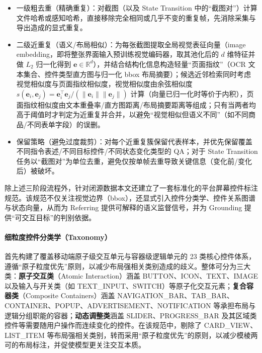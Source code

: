\begin{itemize}
  \item 一级粗去重（精确重复）：对截图（以及 State Transition 中的“截图对”）计算文件哈希或感知哈希，直接移除完全相同或几乎不变的重复帧，先消除采集与导出造成的显式重复。
  \item 二级近重复（语义/布局相似）：为每张截图提取全局视觉表征向量（image embedding，即将整张界面输入预训练视觉编码器，取其池化后的 $d$ 维特征并做 $L_2$ 归一化得到 $\mathbf{e}\in\mathbb{R}^d$），并结合结构化信息构造轻量“页面指纹”（OCR 文本集合、控件类型直方图与归一化 bbox 布局摘要）；候选近邻检索同时考虑视觉相似度与页面指纹相似度，视觉相似度由余弦相似度 $s(\mathbf{e}_i,\mathbf{e}_j)=\mathbf{e}_i^\top\mathbf{e}_j/(\|\mathbf{e}_i\|\|\mathbf{e}_j\|)$ 计算（向量已归一化时等价于内积），页面指纹相似度由文本重叠率/直方图距离/布局摘要距离等组成；只有当两者均高于阈值时才判定为近重复并合并，以避免“视觉相似但语义不同”（如不同商品/不同表单字段）的误删。
  \item 保留策略（避免过度裁剪）：对每个近重复簇保留代表样本，并优先保留覆盖不同指令表述/不同目标控件/不同状态变化类型的 QA；对于 State Transition 任务以“截图对”为单位去重，避免仅按单帧去重导致关键信息（变化前/变化后）被破坏。
\end{itemize}

除上述三阶段流程外，针对闭源数据本文还建立了一套标准化的平台屏幕控件标注规范。该规范不仅关注视觉边界（bbox），还显式引入控件分类学、控件关系图谱与状态向量，从而为 Referring 提供可解释的语义监督信号，并为 Grounding 提供“可交互目标”的判别依据。

\paragraph{细粒度控件分类学（Taxonomy）}
首先构建了覆盖移动端原子级交互单元与容器级逻辑单元的 23 类核心控件体系，遵循“原子粒度优先”原则，以减少布局强相关类别造成的歧义。整体可分为三大类：\textbf{原子交互类}（Atomic Interaction）涵盖 BUTTON、ICON、TEXT、IMAGE 以及输入与开关类（如 TEXT\_INPUT、SWITCH）等原子化交互元素；\textbf{复合容器类}（Composite Containers）涵盖 NAVIGATION\_BAR、TAB\_BAR、CONTAINER、POPUP、ADVERTISEMENT、NOTIFICATION 等承担布局与逻辑分组职能的容器；\textbf{动态调整类}涵盖 SLIDER、PROGRESS\_BAR 及其区域类控件等需要随用户操作而连续变化的控件。在该规范中，剔除了 CARD\_VIEW、LIST\_ITEM 等布局强相关类别，转而采用“原子粒度优先”的原则，以减少模棱两可的布局标注，并促使模型更关注交互本质。

